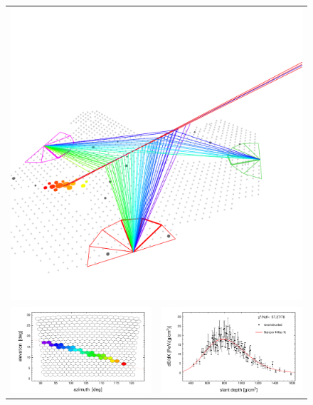 \documentclass[10pt,a4paper,twoside]{report}
\begin{document}
\begin{figure}
  \centering
  \begin{tabular}{cc}
    \multicolumn{2}{c}{\includegraphics[scale=0.4]{./plot/AugerEvent_200812301774}}\\
    \includegraphics[scale=0.35]{./plot/camera} &
    \includegraphics[scale=0.35]{./plot/gh}

\end{tabular}
\end{figure}
\end{document}
